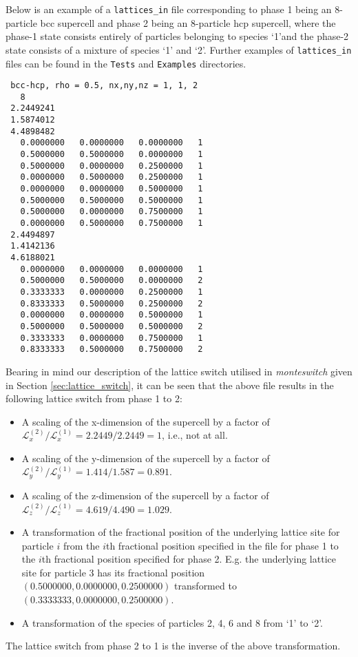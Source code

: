\documentclass{report}
\begin{document}
Below is an example of a \texttt{lattices\_in} file corresponding to phase 1 being an 8-particle bcc supercell and phase 2 being an 8-particle hcp 
supercell, where the phase-1 state consists entirely of particles belonging to species `1'and the phase-2 state consists of a mixture of species `1'
and `2'. Further examples of \texttt{lattices\_in} files can be found in the \texttt{Tests} and \texttt{Examples} directories.
\begin{verbatim}
 bcc-hcp, rho = 0.5, nx,ny,nz = 1, 1, 2
   8
 2.2449241     
 1.5874012     
 4.4898482
   0.0000000   0.0000000   0.0000000   1
   0.5000000   0.5000000   0.0000000   1
   0.5000000   0.0000000   0.2500000   1
   0.0000000   0.5000000   0.2500000   1
   0.0000000   0.0000000   0.5000000   1
   0.5000000   0.5000000   0.5000000   1
   0.5000000   0.0000000   0.7500000   1
   0.0000000   0.5000000   0.7500000   1
 2.4494897     
 1.4142136     
 4.6188021     
   0.0000000   0.0000000   0.0000000   1
   0.5000000   0.5000000   0.0000000   2
   0.3333333   0.0000000   0.2500000   1
   0.8333333   0.5000000   0.2500000   2
   0.0000000   0.0000000   0.5000000   1
   0.5000000   0.5000000   0.5000000   2
   0.3333333   0.0000000   0.7500000   1
   0.8333333   0.5000000   0.7500000   2
\end{verbatim}
Bearing in mind our description of the lattice switch utilised in \emph{monteswitch} given in Section \ref{sec:lattice_switch}, it can be seen that
the above file results in the following lattice switch from phase 1 to 2:
\begin{itemize}
\item A scaling of the x-dimension of the supercell by a factor of $\mathcal{L}_x^{(2)}/\mathcal{L}_x^{(1)}=2.2449/2.2449=1$, i.e., not at all.
\item A scaling of the y-dimension of the supercell by a factor of $\mathcal{L}_y^{(2)}/\mathcal{L}_y^{(1)}=1.414/1.587=0.891$.
\item A scaling of the z-dimension of the supercell by a factor of $\mathcal{L}_z^{(2)}/\mathcal{L}_z^{(1)}=4.619/4.490=1.029$.
\item A transformation of the fractional position of the underlying lattice site for particle $i$ from the $i$th fractional position specified in the file
for phase 1 to the $i$th fractional position specified for phase 2. E.g. the underlying lattice site for particle 3 has its fractional position
$(0.5000000,0.0000000,0.2500000)$ transformed to $(0.3333333,0.0000000,0.2500000)$.
\item A transformation of the species of particles 2, 4, 6 and 8 from `1' to `2'.
\end{itemize}
The lattice switch from phase 2 to 1 is the inverse of the above transformation.
\end{document}
